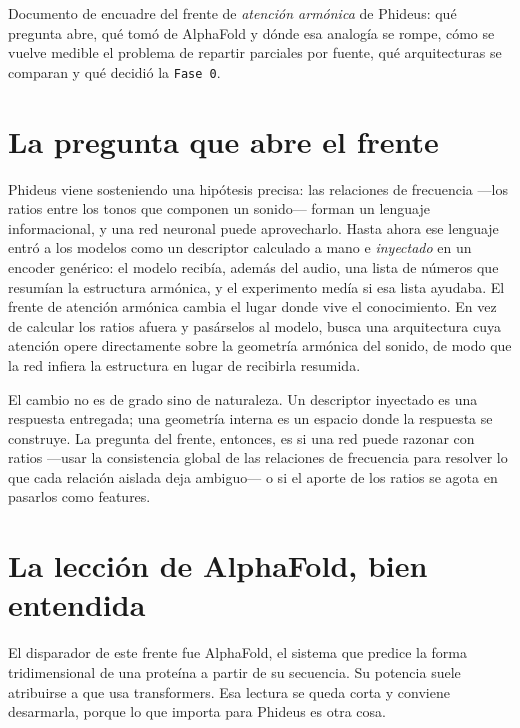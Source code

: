 \documentclass[11pt]{article}
\begin{document}

\begin{quietbox}
Documento de encuadre del frente de \emph{atención armónica} de Phideus: qué pregunta abre, qué tomó de AlphaFold y dónde esa analogía se rompe, cómo se vuelve medible el problema de repartir parciales por fuente, qué arquitecturas se comparan y qué decidió la \texttt{Fase 0}.
\end{quietbox}

\section{La pregunta que abre el frente}

Phideus viene sosteniendo una hipótesis precisa: las relaciones de frecuencia —los ratios entre los tonos que componen un sonido— forman un lenguaje informacional, y una red neuronal puede aprovecharlo. Hasta ahora ese lenguaje entró a los modelos como un descriptor calculado a mano e \emph{inyectado} en un encoder genérico: el modelo recibía, además del audio, una lista de números que resumían la estructura armónica, y el experimento medía si esa lista ayudaba. El frente de atención armónica cambia el lugar donde vive el conocimiento. En vez de calcular los ratios afuera y pasárselos al modelo, busca una arquitectura cuya atención opere directamente sobre la geometría armónica del sonido, de modo que la red infiera la estructura en lugar de recibirla resumida.

El cambio no es de grado sino de naturaleza. Un descriptor inyectado es una respuesta entregada; una geometría interna es un espacio donde la respuesta se construye. La pregunta del frente, entonces, es si una red puede razonar con ratios —usar la consistencia global de las relaciones de frecuencia para resolver lo que cada relación aislada deja ambiguo— o si el aporte de los ratios se agota en pasarlos como features.

\section{La lección de AlphaFold, bien entendida}

El disparador de este frente fue AlphaFold, el sistema que predice la forma tridimensional de una proteína a partir de su secuencia. Su potencia suele atribuirse a que usa transformers. Esa lectura se queda corta y conviene desarmarla, porque lo que importa para Phideus es otra cosa.
\end{document}
